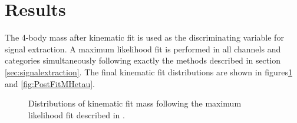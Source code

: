 \section{Results}
\label{sec:Hhhresults}

The 4-body mass after kinematic fit is used as the discriminating variable for
signal extraction. A maximum likelihood fit is performed in all channels and
categories simultaneously following exactly the methods described in section
\ref{sec:signalextraction}. The final kinematic fit distributions are shown in
figures\ref{fig:PostFitMHmutau} and \ref{fig:PostFitMHetau}.

\begin{figure}
\begin{center}

\end{center}
\caption{
Distributions of kinematic fit mass following the maximum likelihood fit
described in .}
\label{fig:PostFitMHmutau}
\end{figure} 


